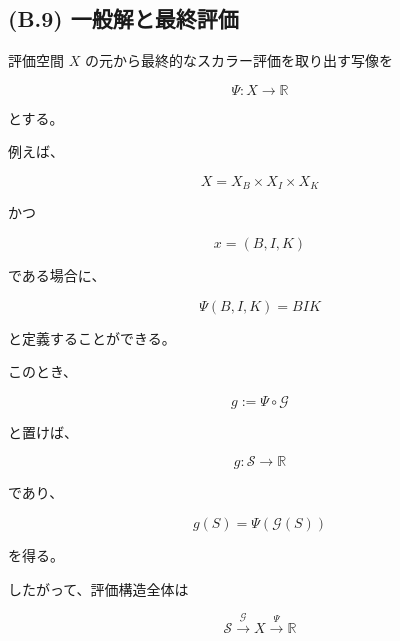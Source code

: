 \documentclass[a4paper,11pt]{article}
\newcommand{\Solver}{\mathcal{S}}
\newcommand{\R}{\mathbb{R}}
\begin{document}
\subsection{(B.9) 一般解と最終評価}
\label{subsec:B9}

評価空間 $X$ の元から最終的なスカラー評価を取り出す写像を

\begin{equation}
    \Psi:
    X
    \longrightarrow
    \R
    \label{eq:B-final-evaluation-map}
\end{equation}

とする。

例えば、

\begin{equation}
    X
    =
    X_B\times X_I\times X_K
\end{equation}

かつ

\begin{equation}
    x=(B,I,K)
\end{equation}

である場合に、

\begin{equation}
    \Psi(B,I,K)
    =
    BIK
    \label{eq:B-ECA-final-evaluation}
\end{equation}

と定義することができる。

このとき、

\begin{equation}
    g
    :=
    \Psi\circ\mathcal{G}
    \label{eq:B-composed-evaluation}
\end{equation}

と置けば、

\begin{equation}
    \boxed{
        g:
        \Solver
        \longrightarrow
        \R
    }
\end{equation}

であり、

\begin{equation}
    \boxed{
        g(S)
        =
        \Psi(\mathcal{G}(S))
    }
    \label{eq:B-scalar-evaluation}
\end{equation}

を得る。

したがって、評価構造全体は

\begin{equation}
    \boxed{
        \Solver
        \xrightarrow{\mathcal{G}}
        X
        \xrightarrow{\Psi}
        \R
    }
    \label{eq:B-evaluation-chain}
\end{equation}
\end{document}
